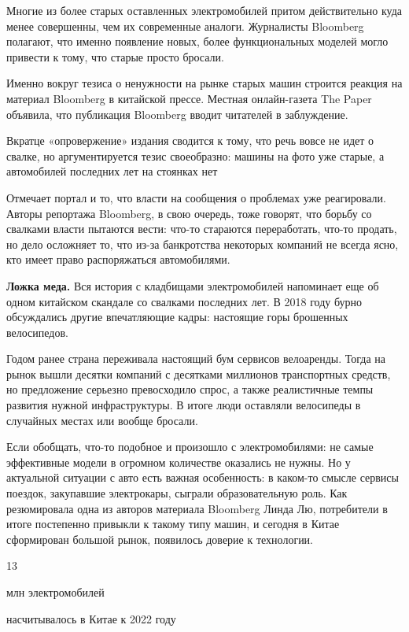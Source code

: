 Многие из более старых оставленных электромобилей притом действительно куда менее совершенны, чем их современные аналоги. Журналисты Bloomberg полагают, что именно появление новых, более функциональных моделей могло привести к тому, что старые просто бросали.

Именно вокруг тезиса о ненужности на рынке старых машин строится реакция на материал Bloomberg в китайской прессе. Местная онлайн-газета The Paper объявила, что публикация Bloomberg вводит читателей в заблуждение.

\vspace*{1em}
\begin{center}
    {\Large Вкратце «опровержение» издания сводится к тому, что речь вовсе не идет о свалке, но аргументируется тезис своеобразно: машины на фото уже старые, а автомобилей последних лет на стоянках нет}
\end{center}
\vspace*{1em}

Отмечает портал и то, что власти на сообщения о проблемах уже реагировали. Авторы репортажа Bloomberg, в свою очередь, тоже говорят, что борьбу со свалками власти пытаются вести: что-то стараются переработать, что-то продать, но дело осложняет то, что из-за банкротства некоторых компаний не всегда ясно, кто имеет право распоряжаться автомобилями.

\textbf{Ложка меда.} Вся история с кладбищами электромобилей напоминает еще об одном китайском скандале со свалками последних лет. В 2018 году бурно обсуждались другие впечатляющие кадры: настоящие горы брошенных велосипедов.

Годом ранее страна переживала настоящий бум сервисов велоаренды. Тогда на рынок вышли десятки компаний с десятками миллионов транспортных средств, но предложение серьезно превосходило спрос, а также реалистичные темпы развития нужной инфраструктуры. В итоге люди оставляли велосипеды в случайных местах или вообще бросали.

Если обобщать, что-то подобное и произошло с электромобилями: не самые эффективные модели в огромном количестве оказались не нужны. Но у актуальной ситуации с авто есть важная особенность: в каком-то смысле сервисы поездок, закупавшие электрокары, сыграли образовательную роль. Как резюмировала одна из авторов материала Bloomberg Линда Лю, потребители в итоге постепенно привыкли к такому типу машин, и сегодня в Китае сформирован большой рынок, появилось доверие к технологии.

\vspace*{1em}
\begin{center}
    {\Huge 13}

    {\Large млн электромобилей}

    насчитывалось в Китае к 2022 году
\end{center}
\vspace*{1em}

